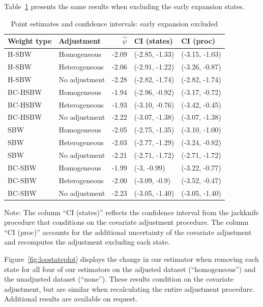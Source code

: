 Table~\ref{tab:confintmainc2} presents the same results when excluding the early expansion states.

\begin{table}[h!]
\centering
\begin{threeparttable}
\caption{Point estimates and confidence intervals: early expansion excluded}
\label{tab:confintmainc2}
\begin{tabular}{llrll}
  \hline
Weight type & Adjustment & $\hat{\psi}$ & CI (states) & CI (proc) \\ 
  \hline
H-SBW & Homogeneous & -2.09 & (-2.85, -1.33) & (-3.15, -1.03) \\ 
  H-SBW & Heterogeneous & -2.06 & (-2.91, -1.22) & (-3.26, -0.87) \\ 
  H-SBW & No adjustment & -2.28 & (-2.82, -1.74) & (-2.82, -1.74) \\ 
  BC-HSBW & Homogeneous & -1.94 & (-2.96, -0.92) & (-3.17, -0.72) \\ 
  BC-HSBW & Heterogeneous & -1.93 & (-3.10, -0.76) & (-3.42, -0.45) \\ 
  BC-HSBW & No adjustment & -2.22 & (-3.07, -1.38) & (-3.07, -1.38) \\ 
  SBW & Homogeneous & -2.05 & (-2.75, -1.35) & (-3.10, -1.00) \\ 
  SBW & Heterogeneous & -2.03 & (-2.77, -1.29) & (-3.24, -0.82) \\ 
  SBW & No adjustment & -2.21 & (-2.71, -1.72) & (-2.71, -1.72) \\ 
  BC-SBW & Homogeneous & -1.99 & (-3, -0.99) & (-3.22, -0.77) \\ 
  BC-SBW & Heterogeneous & -2.00 & (-3.09, -0.9) & (-3.52, -0.47) \\ 
  BC-SBW & No adjustment & -2.23 & (-3.05, -1.40) & (-3.05, -1.40) \\ 
   \hline
\end{tabular}
    \begin{tablenotes}
      \item[] Note: The column ``CI (states)'' reflects the confidence interval from the jackknife procedure that conditions on the covariate adjustment procedure. The column ``CI (proc)'' accounts for the additional uncertainty of the covariate adjustment and recomputes the adjustment excluding each state.
    \end{tablenotes}
\end{threeparttable}
\end{table}

Figure~\ref{fig:loostateplot} displays the change in our estimator when removing each state for all four of our estimators on the adjusted dataset (``homogeneous'') and the unadjusted dataset (``none''). These results condition on the covariate adjustment, but are similar when recalculating the entire adjustment procedure. Additional results are available on request.

